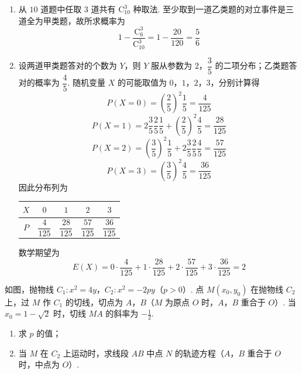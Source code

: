 \begin{solution}
\begin{enumerate}
\item 从 \(10\) 道题中任取 \(3\) 道共有 \(\mathrm C_{10}^3\) 种取法. 至少取到一道乙类题的对立事件是三道全为甲类题，故所求概率为
\[
1-\frac{\mathrm C_6^3}{\mathrm C_{10}^3}=1-\frac{20}{120}=\frac56
\]

\item 设两道甲类题答对的个数为 \(Y\)，则 \(Y\) 服从参数为 \(2\)，\(\dfrac35\) 的二项分布；乙类题答对的概率为 \(\dfrac45\). 随机变量 \(X\) 的可能取值为 \(0\)，\(1\)，\(2\)，\(3\)，分别计算得
\[
P(X=0)=\left(\frac25\right)^2\frac15=\frac4{125}
\]
\[
P(X=1)=2\frac35\frac25\frac15+\left(\frac25\right)^2\frac45=\frac{28}{125}
\]
\[
P(X=2)=\left(\frac35\right)^2\frac15+2\frac35\frac25\frac45=\frac{57}{125}
\]
\[
P(X=3)=\left(\frac35\right)^2\frac45=\frac{36}{125}
\]
因此分布列为

\begin{center}
\begin{tabular}{c|cccc}
\(X\) & \(0\) & \(1\) & \(2\) & \(3\) \\
\hline
\(P\) & \(\dfrac4{125}\) & \(\dfrac{28}{125}\) & \(\dfrac{57}{125}\) & \(\dfrac{36}{125}\)
\end{tabular}
\end{center}

数学期望为
\[
E(X)=0\cdot\frac4{125}+1\cdot\frac{28}{125}+2\cdot\frac{57}{125}+3\cdot\frac{36}{125}=2
\]
\end{enumerate}
\end{solution}

\begin{problem}
如图，抛物线 \(C_1:x^2 = 4y\)，\(C_2:x^2 = -2py\)（\(p > 0\)）. 点 \(M(x_0, y_0)\) 在抛物线 \(C_2\) 上，过 \(M\) 作 \(C_1\) 的切线，切点为 \(A\)，\(B\)（\(M\) 为原点 \(O\) 时，\(A\)，\(B\) 重合于 \(O\)）. 当 \(x_0 = 1 - \sqrt{2}\) 时，切线 \(MA\) 的斜率为 \(-\frac{1}{2}\).

\begin{enumerate}
\item 求 \(p\) 的值；
\item 当 \(M\) 在 \(C_2\) 上运动时，求线段 \(AB\) 中点 \(N\) 的轨迹方程（\(A\)，\(B\) 重合于 \(O\) 时，中点为 \(O\)）.
\end{enumerate}

\end{problem}

